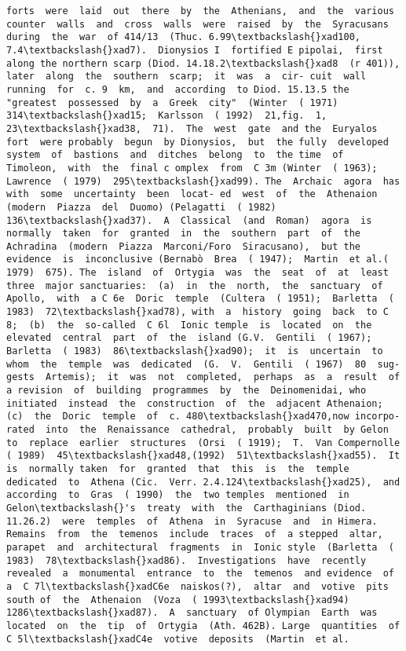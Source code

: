 \documentclass[11pt]{article}
\begin{document}
\begin{Verbatim}[commandchars=\\\{\}]
forts  were  laid  out  there  by  the  Athenians,  and  the  various counter  walls  and  cross  walls  were  raised  by  the  Syracusans during  the  war  of 414/13  (Thuc. 6.99\textbackslash{}xad100,  7.4\textbackslash{}xad7).  Dionysios I  fortified E pipolai,  first along the northern scarp (Diod. 14.18.2\textbackslash{}xad8  (r 401)),  later  along  the  southern  scarp;  it  was  a  cir- cuit  wall  running  for  c. 9  km,  and  according  to Diod. 15.13.5 the  "greatest  possessed  by  a  Greek  city"  (Winter  ( 1971) 314\textbackslash{}xad15;  Karlsson  ( 1992)  21,fig.  1,  23\textbackslash{}xad38,  71).  The  west  gate  and the  Euryalos  fort  were probably  begun  by Dionysios,  but  the fully  developed  system  of  bastions  and  ditches  belong  to  the time  of  Timoleon,  with  the  final c omplex  from  C 3m (Winter  ( 1963);  Lawrence  ( 1979)  295\textbackslash{}xad99). The  Archaic  agora  has  with  some  uncertainty  been  locat- ed  west  of  the  Athenaion  (modern  Piazza  del  Duomo) (Pelagatti  ( 1982)  136\textbackslash{}xad37).  A  Classical  (and  Roman)  agora  is normally  taken  for  granted  in  the  southern  part  of  the Achradina  (modern  Piazza  Marconi/Foro  Siracusano),  but the  evidence  is  inconclusive (Bernabò  Brea  ( 1947);  Martin  et al.( 1979)  675). The  island  of  Ortygia  was  the  seat  of  at  least  three  major sanctuaries:  (a)  in  the  north,  the  sanctuary  of  Apollo,  with  a C 6e  Doric  temple  (Cultera  ( 1951);  Barletta  ( 1983)  72\textbackslash{}xad78), with  a  history  going  back  to C 8;  (b)  the  so-called  C 6l  Ionic temple  is  located  on  the  elevated  central  part  of  the  island (G.V.  Gentili  ( 1967);  Barletta  ( 1983)  86\textbackslash{}xad90);  it  is  uncertain  to whom  the  temple  was  dedicated  (G.  V.  Gentili  ( 1967)  80  sug- gests  Artemis);  it  was  not  completed,  perhaps  as  a  result  of  a revision  of  building  programmes  by  the  Deinomenidai, who  initiated  instead  the  construction  of  the  adjacent Athenaion;  (c)  the  Doric  temple  of  c. 480\textbackslash{}xad470,now incorpo- rated  into  the  Renaissance  cathedral,  probably  built  by Gelon  to  replace  earlier  structures  (Orsi  ( 1919);  T.  Van Compernolle  ( 1989)  45\textbackslash{}xad48,(1992)  51\textbackslash{}xad55).  It  is  normally taken  for  granted  that  this  is  the  temple  dedicated  to  Athena (Cic.  Verr. 2.4.124\textbackslash{}xad25),  and  according  to  Gras  ( 1990)  the  two temples  mentioned  in  Gelon\textbackslash{}'s  treaty  with  the  Carthaginians (Diod. 11.26.2)  were  temples  of  Athena  in  Syracuse  and  in Himera.  Remains  from  the  temenos  include  traces  of  a stepped  altar,  parapet  and  architectural  fragments  in  Ionic style  (Barletta  ( 1983)  78\textbackslash{}xad86).  Investigations  have  recently revealed  a  monumental  entrance  to  the  temenos  and evidence  of  a  C 7l\textbackslash{}xadC6e  naiskos(?),  altar  and  votive  pits  south of  the  Athenaion  (Voza  ( 1993\textbackslash{}xad94)  1286\textbackslash{}xad87).  A  sanctuary  of Olympian  Earth  was  located  on  the  tip  of  Ortygia  (Ath. 462B). Large  quantities  of  C 5l\textbackslash{}xadC4e  votive  deposits  (Martin  et al. 
\end{Verbatim}
\end{document}
